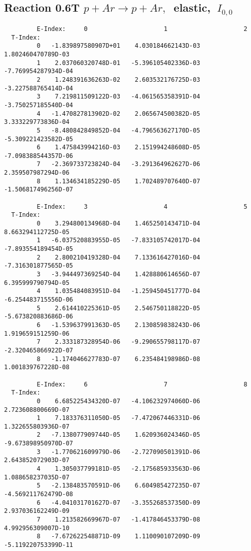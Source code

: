 \documentclass[12pt]{article}
\begin{document}
\subsection{
Reaction 0.6T  $p + Ar \rightarrow p + Ar ,\ $
 elastic, $\  I_{0,0}$
}

\begin{small}\begin{verbatim}
         E-Index:     0                     1                     2
  T-Index:
         0   -1.839897580907D+01    4.030184662143D-03    1.802460470789D-03
         1    2.037060320748D-01   -5.396105402336D-03   -7.769954287934D-04
         2    1.248391636263D-02    2.603532176725D-03   -3.227588765414D-04
         3    7.219811509122D-03   -4.061565358391D-04   -3.750257185540D-04
         4   -1.470827813902D-02    2.065674500382D-05    3.333229773836D-04
         5   -8.480842849852D-04   -4.796563627170D-05   -5.309221423582D-05
         6    1.475843994216D-03    2.151994248608D-05   -7.098388544357D-06
         7   -2.369733723824D-04   -3.291364962627D-06    2.359507987294D-06
         8    1.134634185229D-05    1.702489707640D-07   -1.506817496256D-07
 
         E-Index:     3                     4                     5
  T-Index:
         0    3.294800134968D-04    1.465250143471D-04    8.663294112725D-05
         1   -6.037520883955D-05   -7.833105742017D-04   -7.893554189454D-05
         2    2.800210419328D-04    7.133616427016D-04   -7.316301877565D-05
         3   -3.944497369254D-04    1.428880614656D-07    6.395999790794D-05
         4    1.035484083951D-04   -1.259450451777D-04   -6.254483715556D-06
         5    2.614410225361D-05    2.546750118822D-05   -5.673820883686D-06
         6   -1.539637991363D-05    2.130859838243D-06    1.919659151259D-06
         7    2.333187328954D-06   -9.290655798117D-07   -2.320465866922D-07
         8   -1.174046627783D-07    6.235484198986D-08    1.001839767228D-08
 
         E-Index:     6                     7                     8
  T-Index:
         0    6.685225434320D-07   -4.106232974060D-06    2.723608800669D-07
         1    7.183376311050D-05   -7.472067446331D-06    1.322655803936D-07
         2   -7.138077909744D-05    1.620936024346D-05   -9.673898950970D-07
         3   -1.770621609979D-06   -2.727090501391D-06    2.643852072903D-07
         4    1.305037799181D-05   -2.175685933563D-06    1.088658237035D-07
         5   -2.138483570591D-06    6.604985427235D-07   -4.569211762479D-08
         6   -4.041031701627D-07   -3.355268537350D-09    2.937036162249D-09
         7    1.213582669967D-07   -1.417846453379D-08    4.992956309007D-10
         8   -7.672622548871D-09    1.110090107209D-09   -5.119220753399D-11
\end{verbatim}\end{small}
 
\end{document}
